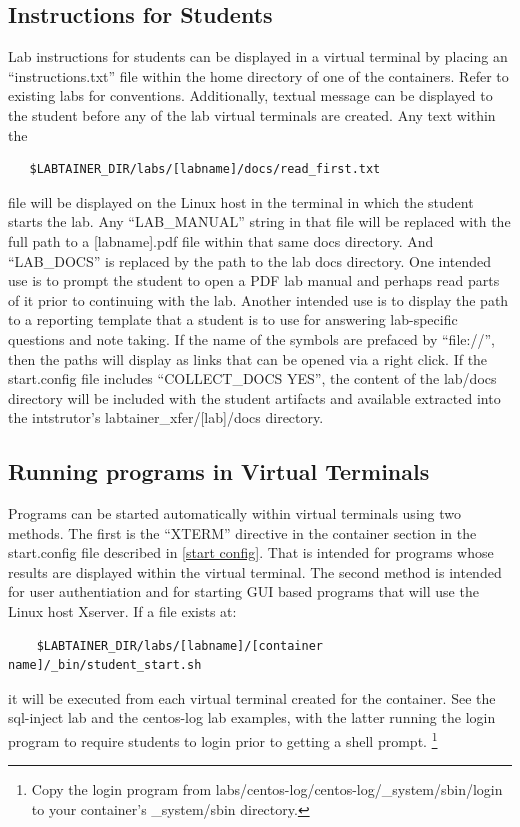 \documentclass[12pt]{article}
\begin{document}
\subsection {Instructions for Students} \label{instructions}
Lab instructions for students can be displayed in a virtual terminal by placing an
``instructions.txt'' file within the home directory of one of the containers.  Refer to existing
labs for conventions.  Additionally, textual message can be displayed to the student before any 
of the lab virtual terminals are created.  Any text within the 
\begin{verbatim}
   $LABTAINER_DIR/labs/[labname]/docs/read_first.txt
\end{verbatim}
\noindent file will be displayed on the Linux host in the terminal in which the student
starts the lab.  Any ``LAB\_MANUAL'' string in that file will be replaced with the full path
to a [labname].pdf file within that same docs directory.  And ``LAB\_DOCS'' is replaced by the
path to the lab docs directory.  One intended use is to prompt the
student to open a PDF lab manual and perhaps read parts of it prior to continuing with the lab.
Another intended use is to display the path to a reporting template that a student is to use
for answering lab-specific questions and note taking.  If the name of the symbols are prefaced
by ``file://'', then the paths will display as links that can be opened via a right click.
If the start.config file includes ``COLLECT\_DOCS YES'', the content of the lab/docs directory will be
included with the student artifacts and available extracted into the intstrutor's 
labtainer\_xfer/[lab]/docs directory.

\subsection {Running programs in Virtual Terminals}
\label {student start}
Programs can be started automatically within virtual terminals using two methods.
The first is the ``XTERM'' directive in the container section in the start.config file
described in \ref{start config}.  That is intended for programs whose results are displayed
within the virtual terminal.  The second method is intended for user authentiation and
for starting GUI based programs
that will use the Linux host Xserver.  If a file exists at:
\begin{verbatim}
    $LABTAINER_DIR/labs/[labname]/[container name]/_bin/student_start.sh
\end{verbatim}
it will be executed from each virtual terminal created for the container.
See the sql-inject lab and the centos-log lab examples, with the latter
running the login program to require students to login prior to getting a shell prompt.
\footnote{Copy the login program from labs/centos-log/centos-log/\_system/sbin/login
to your container's \_system/sbin directory.}
\end{document}
